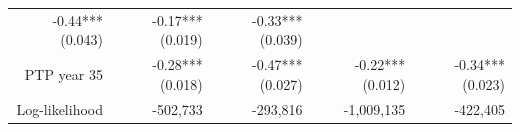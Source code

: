 \documentclass[]{article}
\begin{document}
\begin{longtable}[c]{@{}rrrrr@{}}
\begin{minipage}[t]{0.16\columnwidth}
-0.44*** (0.043)
\strut\end{minipage} &
\begin{minipage}[t]{0.18\columnwidth}\raggedleft\strut
-0.17*** (0.019)
\strut\end{minipage} &
\begin{minipage}[t]{0.15\columnwidth}\raggedleft\strut
-0.33*** (0.039)
\strut\end{minipage}\tabularnewline
\begin{minipage}[t]{0.17\columnwidth}\raggedleft\strut
PTP year 35
\strut\end{minipage} &
\begin{minipage}[t]{0.20\columnwidth}\raggedleft\strut
-0.28*** (0.018)
\strut\end{minipage} &
\begin{minipage}[t]{0.16\columnwidth}\raggedleft\strut
-0.47*** (0.027)
\strut\end{minipage} &
\begin{minipage}[t]{0.18\columnwidth}\raggedleft\strut
-0.22*** (0.012)
\strut\end{minipage} &
\begin{minipage}[t]{0.15\columnwidth}\raggedleft\strut
-0.34*** (0.023)
\strut\end{minipage}\tabularnewline
\begin{minipage}[t]{0.17\columnwidth}\raggedleft\strut
Log-likelihood
\strut\end{minipage} &
\begin{minipage}[t]{0.20\columnwidth}\raggedleft\strut
-502,733
\strut\end{minipage} &
\begin{minipage}[t]{0.16\columnwidth}\raggedleft\strut
-293,816
\strut\end{minipage} &
\begin{minipage}[t]{0.18\columnwidth}\raggedleft\strut
-1,009,135
\strut\end{minipage} &
\begin{minipage}[t]{0.15\columnwidth}\raggedleft\strut
-422,405
\strut\end{minipage}\tabularnewline
\bottomrule
\end{longtable}

\pagebreak
\end{document}
